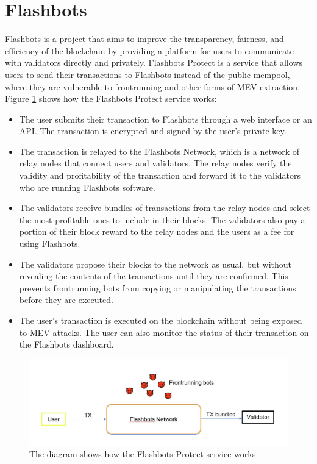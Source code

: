 \documentclass{report}
\begin{document}
\section{Flashbots}
Flashbots is a project that aims to improve the transparency, fairness, and efficiency of the blockchain by providing a platform for users to communicate with validators directly and privately. Flashbots Protect is a service that allows users to send their transactions to Flashbots instead of the public mempool, where they are vulnerable to frontrunning and other forms of MEV extraction.\\
Figure \ref{fig:f1} shows how the Flashbots Protect service works:
\begin{itemize}
	\item The user submits their transaction to Flashbots through a web interface or an API. The transaction is encrypted and signed by the user’s private key.
	\item The transaction is relayed to the Flashbots Network, which is a network of relay nodes that connect users and validators. The relay nodes verify the validity and profitability of the transaction and forward it to the validators who are running Flashbots software.
	\item The validators receive bundles of transactions from the relay nodes and select the most profitable ones to include in their blocks. The validators also pay a portion of their block reward to the relay nodes and the users as a fee for using Flashbots.
	\item The validators propose their blocks to the network as usual, but without revealing the contents of the transactions until they are confirmed. This prevents frontrunning bots from copying or manipulating the transactions before they are executed.
	\item The user’s transaction is executed on the blockchain without being exposed to MEV attacks. The user can also monitor the status of their transaction on the Flashbots dashboard.
\end{itemize}
\begin{center}
	\begin{figure}
		\centering
		\includegraphics[width=0.8\linewidth]{Fig/F1}
		\caption{The diagram shows how the Flashbots Protect service works}
		\label{fig:f1}
	\end{figure}
\end{center}
\end{document}
